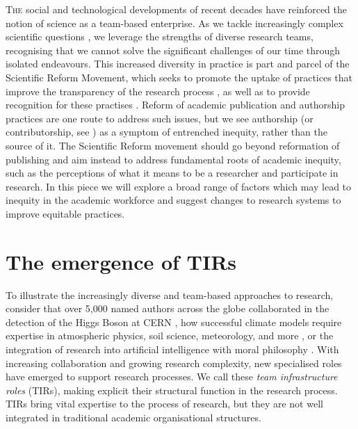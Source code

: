 \documentclass[authordate,meta,issue]{jote-new-article}
\begin{document}
\lettrine{T}{he} social and technological developments of recent decades have reinforced the notion of science as a team-based enterprise. As we tackle increasingly complex scientific questions \parencites{Coles2022}, we leverage the strengths of diverse research teams, recognising that we cannot solve the significant challenges of our time through isolated endeavours. This increased diversity in practice is part and parcel of the Scientific Reform Movement, which seeks to promote the uptake of practices that improve the transparency of the research process \parencites{Penders2022}, as well as to provide recognition for these practises \parencites{Coles2023}. Reform of academic publication and authorship practices are one route to address such issues, but we see authorship (or contributorship, see \textcites{Rennie1997}) as a symptom of entrenched inequity, rather than the source of it. The Scientific Reform movement should go beyond reformation of publishing and aim instead to address fundamental roots of academic inequity, such as the perceptions of what it means to be a researcher and participate in research. In this piece we will explore a broad range of factors which may lead to inequity in the academic workforce and suggest changes to research systems to improve equitable practices.







\section{The emergence of TIRs}







To illustrate the increasingly diverse and team-based approaches to research, consider that over 5,000 named authors across the globe collaborated in the detection of the Higgs Boson at CERN \parencites{Castelvecchi2015}, how successful climate models require expertise in atmospheric physics, soil science, meteorology, and more \parencites{Huebner2017}, or the integration of research into artificial intelligence with moral philosophy \parencites{Jobin2019}. With increasing collaboration and growing research complexity, new specialised roles have emerged to support research processes. We call these \emph{team infrastructure roles }(TIRs), making explicit their structural function in the research process. TIRs bring vital expertise to the process of research, but they are not well integrated in traditional academic organisational structures.
\end{document}
